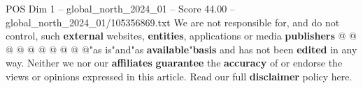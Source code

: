 \begin{textsample}{POS Dim 1 – global\_north\_2024\_01 – Score 44.00 – global\_north\_2024\_01/105356869.txt}
We are not responsible for, and do not control, such \textbf{external} websites, \textbf{entities}, applications or media \textbf{publishers} @ @ @ @ @ @ @ @ @ @"as is"and"as \textbf{available}"\textbf{basis} and has not been \textbf{edited} in any way.
Neither we nor our \textbf{affiliates} \textbf{guarantee} the \textbf{accuracy} of or endorse the views or opinions expressed in this article.
Read our full \textbf{disclaimer} policy here.

\end{textsample}
